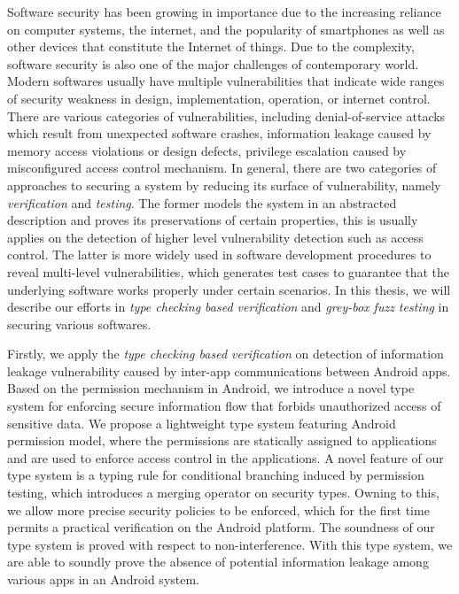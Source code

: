 
Software security has been growing in importance due to the increasing reliance on computer systems, the internet, and the popularity of smartphones as well as other devices that constitute the Internet of things. Due to the complexity, software security is also one of the major challenges of contemporary world. Modern softwares usually have multiple vulnerabilities that indicate wide ranges of security weakness in design, implementation, operation, or internet control. There are various categories of vulnerabilities, including denial-of-service attacks which result from unexpected software crashes, information leakage caused by memory access violations or design defects, privilege escalation caused by misconfigured access control mechanism. In general, there are two categories of approaches to securing a system by reducing its surface of vulnerability, namely \emph{verification} and \emph{testing}. The former models the system in an abstracted description and proves its preservations of certain properties, this is usually applies on the detection of higher level vulnerability detection such as access control. The latter is more widely used in software development procedures to reveal multi-level vulnerabilities, which generates test cases to guarantee that the underlying software works properly under certain scenarios. In this thesis, we will describe our efforts in \emph{type checking based verification} and \emph{grey-box fuzz testing} in securing various softwares.

Firstly, we apply the \emph{type checking based verification} on detection of information leakage vulnerability caused by inter-app communications between Android apps. Based on the permission mechanism in Android, we introduce a novel type system for enforcing secure information flow that forbids unauthorized access of sensitive data. We propose a lightweight type system featuring Android permission model, where the permissions are statically assigned to applications and are used to enforce access control in the applications. A novel feature of our type system is a typing rule for conditional branching induced by permission testing, which introduces a merging operator on security types. Owning to this, we allow more precise security policies to be enforced, which for the first time permits a practical verification on the Android platform. The soundness of our type system is proved with respect to non-interference.
With this type system, we are able to soundly prove the absence of potential information leakage among various apps in an Android system.

